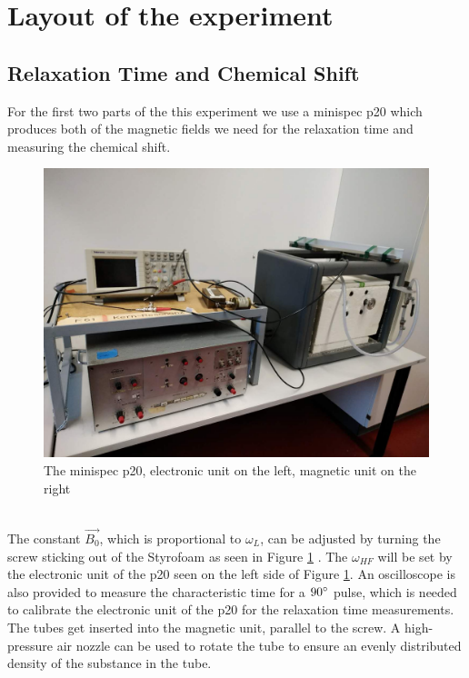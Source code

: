 \section{Layout of the experiment}\label{layout-of-the-experiment}
\subsection{Relaxation Time and Chemical Shift}\label{lay1}
For the first two parts of the this experiment we use a minispec p20 which produces both of the magnetic fields we need for the relaxation time and measuring the chemical shift. \\
\begin{figure}[h!]
	\centering
	\includegraphics[scale=0.18]{images/minispec_p20.jpg}
	\caption{The minispec p20, electronic unit on the left, magnetic unit on the right}
	\label{mini}
\end{figure} \\
The constant $\vec{B_0}$, which is proportional to $\omega_{L}$, can be adjusted by turning the screw sticking out of the Styrofoam as seen in Figure \ref{mini} . The $\omega_{HF}$ will be set by the electronic unit of the p20 seen on the left side of Figure \ref{mini}. An oscilloscope is also provided to measure the characteristic time for a $90\degree$ pulse, which is needed to calibrate the electronic unit of the p20 for the relaxation time measurements. The tubes get inserted into the magnetic unit, parallel to the screw. A high-pressure air nozzle can be used to rotate the tube to ensure an evenly distributed density of the substance in the tube. \\
